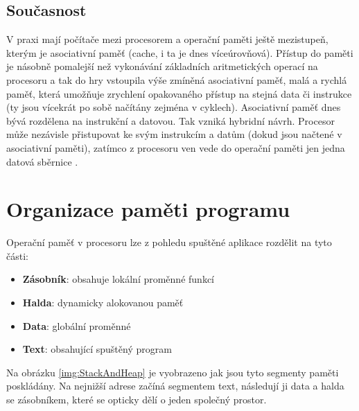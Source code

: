 \documentclass[FM,BP]{tulthesis}
\begin{document}
\newpage
\subsection{Současnost}
V praxi mají počítače mezi procesorem a operační paměti ještě mezistupeň, kterým je asociativní paměť (cache, i ta je dnes víceúrovňová). Přístup do paměti je násobně pomalejší než vykonávání základních aritmetických operací na procesoru a tak do hry vstoupila výše zmíněná asociativní paměť, malá a rychlá paměť, která umožňuje zrychlení opakovaného přístup na stejná data či instrukce (ty jsou vícekrát po sobě načítány zejména v cyklech). Asociativní paměť dnes bývá rozdělena na instrukční a datovou. Tak vzniká hybridní návrh. Procesor může nezávisle přistupovat ke svým instrukcím a datům (dokud jsou načtené v asociativní paměti), zatímco z procesoru ven vede do operační paměti jen jedna datová sběrnice \cite{wiki_Von_Neumannova_architektura}.

\newpage
\section{Organizace paměti programu} \label{kap:Organizace paměti programu}

Operační paměť v procesoru lze z pohledu spuštěné aplikace rozdělit na tyto části: 
\begin{itemize}
    \item \textbf{Zásobník}: obsahuje lokální proměnné funkcí
    \item \textbf{Halda}: dynamicky alokovanou paměť
    \item \textbf{Data}: globální proměnné
    \item \textbf{Text}: obsahující spuštěný program
\end{itemize}

Na obrázku \ref{img:StackAndHeap} je vyobrazeno jak jsou tyto segmenty paměti poskládány. Na nejnižší adrese začíná segmentem text, následují ji data a halda se zásobníkem, které se opticky dělí o jeden společný prostor. \cite{courses_Stack_and_Heap}
\end{document}
